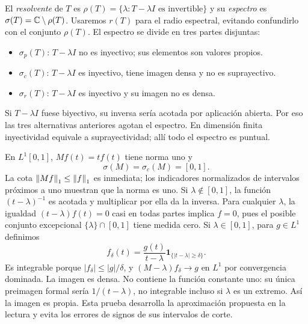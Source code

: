 \begin{definicion}
El \emph{resolvente} de $T$ es $\rho(T)=\{\lambda:T-\lambda I\text{ es invertible}\}$ y su \emph{espectro} es $\sigma(T)=\mathbb C\setminus\rho(T)$. Usaremos $r(T)$ para el radio espectral, evitando confundirlo con el conjunto $\rho(T)$. El espectro se divide en tres partes disjuntas:
\begin{itemize}
\item $\sigma_p(T)$: $T-\lambda I$ no es inyectivo; sus elementos son valores propios.
\item $\sigma_c(T)$: $T-\lambda I$ es inyectivo, tiene imagen densa y no es suprayectivo.
\item $\sigma_r(T)$: $T-\lambda I$ es inyectivo y su imagen no es densa.
\end{itemize}
\end{definicion}
Si $T-\lambda I$ fuese biyectivo, su inversa sería acotada por aplicación abierta. Por eso las tres alternativas anteriores agotan el espectro. En dimensión finita inyectividad equivale a suprayectividad; allí todo el espectro es puntual.

\begin{ejemplo}\label{v3:mult-coordenada}
En $L^1[0,1]$, $Mf(t)=tf(t)$ tiene norma uno y
\[\sigma(M)=\sigma_c(M)=[0,1].
\]
La cota $\left\lVert Mf\right\rVert_1\le\left\lVert f\right\rVert_1$ es inmediata; los indicadores normalizados de intervalos próximos a uno muestran que la norma es uno. Si $\lambda\notin[0,1]$, la función $(t-\lambda)^{-1}$ es acotada y multiplicar por ella da la inversa. Para cualquier $\lambda$, la igualdad $(t-\lambda)f(t)=0$ casi en todas partes implica $f=0$, pues el posible conjunto excepcional $\{\lambda\}\cap[0,1]$ tiene medida cero. Si $\lambda\in[0,1]$, para $g\in L^1$ definimos
\[f_\delta(t)=\frac{g(t)}{t-\lambda}\boldsymbol1_{\{|t-\lambda|\ge\delta\}}.
\]
Es integrable porque $|f_\delta|\le|g|/\delta$, y $(M-\lambda)f_\delta\to g$ en $L^1$ por convergencia dominada. La imagen es densa. No contiene la función constante uno: su única preimagen formal sería $1/(t-\lambda)$, no integrable incluso si $\lambda$ es un extremo. Así la imagen es propia. Esta prueba desarrolla la aproximación propuesta en la lectura y evita los errores de signos de sus intervalos de corte.
\end{ejemplo}

